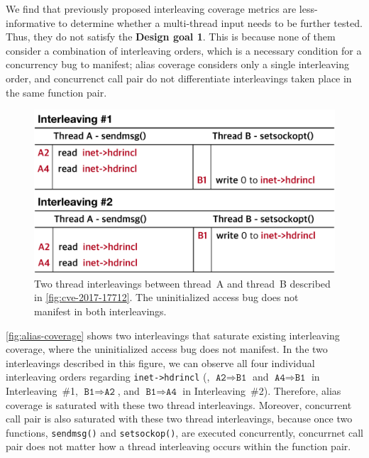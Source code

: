%
We find that previously proposed interleaving coverage metrics are
less-informative to determine whether a multi-thread input needs to be
further tested. Thus, they do not satisfy the \textbf{Design goal 1}.
%
This is because none of them consider a combination of interleaving
orders, which is a necessary condition for a concurrency bug to
manifest; alias coverage considers only a single interleaving order,
and concurrenct call pair do not differentiate interleavings taken
place in the same function pair.



\begin{figure}[t]
  \centering
  \includegraphics[width=0.90\linewidth]{fig/alias-coverage.pdf}
  \caption{Two thread interleavings between thread~A and thread~B
    described in \autoref{fig:cve-2017-17712}. The uninitialized
    access bug does not manifest in both interleavings.}
  \label{fig:alias-coverage}
\end{figure}


\autoref{fig:alias-coverage} shows two interleavings that saturate
existing interleaving coverage, where the uninitialized access bug
does not manifest.
%
In the two interleavings described in this figure, we can observe all
four individual interleaving orders regarding \texttt{inet->hdrincl}
(\ie, $\texttt{A2} \Rightarrow \texttt{B1}$ and
$\texttt{A4} \Rightarrow \texttt{B1}$ in Interleaving~\#1,
$\texttt{B1} \Rightarrow \texttt{A2}$, and
$\texttt{B1} \Rightarrow \texttt{A4}$ in Interleaving~\#2).
%
Therefore, alias coverage is saturated with these two thread
interleavings.
%
Moreover, concurrent call pair is also saturated with these two thread
interleavings, because once two functions, \texttt{sendmsg()} and
\texttt{setsockop()}, are executed concurrently, concurrnet call pair
does not matter how a thread interleaving occurs within the function
pair.

